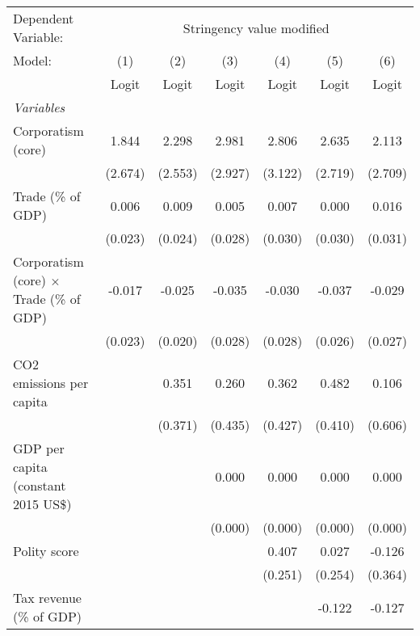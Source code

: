 
\begingroup
\centering
\begin{tabular}{lcccccc}
   \toprule
   Dependent Variable: & \multicolumn{6}{c}{Stringency value modified}\\
   Model:                                          & (1)     & (2)     & (3)     & (4)     & (5)     & (6)\\  
                                                   &  Logit  & Logit   & Logit   & Logit   & Logit   & Logit\\  
   \midrule
   \emph{Variables}\\
   Corporatism (core)                              & 1.844   & 2.298   & 2.981   & 2.806   & 2.635   & 2.113\\   
                                                   & (2.674) & (2.553) & (2.927) & (3.122) & (2.719) & (2.709)\\   
   Trade (\% of GDP)                               & 0.006   & 0.009   & 0.005   & 0.007   & 0.000   & 0.016\\   
                                                   & (0.023) & (0.024) & (0.028) & (0.030) & (0.030) & (0.031)\\   
   Corporatism (core) $\times$ Trade (\% of GDP)   & -0.017  & -0.025  & -0.035  & -0.030  & -0.037  & -0.029\\   
                                                   & (0.023) & (0.020) & (0.028) & (0.028) & (0.026) & (0.027)\\   
   CO2 emissions per capita                        &         & 0.351   & 0.260   & 0.362   & 0.482   & 0.106\\   
                                                   &         & (0.371) & (0.435) & (0.427) & (0.410) & (0.606)\\   
   GDP per capita (constant 2015 US\$)             &         &         & 0.000   & 0.000   & 0.000   & 0.000\\   
                                                   &         &         & (0.000) & (0.000) & (0.000) & (0.000)\\   
   Polity score                                    &         &         &         & 0.407   & 0.027   & -0.126\\   
                                                   &         &         &         & (0.251) & (0.254) & (0.364)\\   
   Tax revenue (\% of GDP)                         &         &         &         &         & -0.122  & -0.127\\   

\end{tabular}

